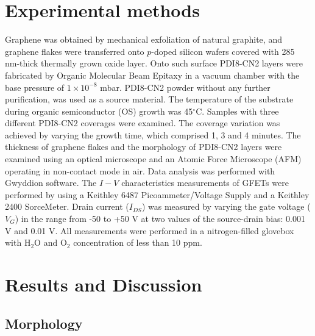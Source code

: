 \documentclass[review]{elsarticle}
\begin{document}
\section{\label{sec:exper}Experimental methods}


Graphene was obtained by mechanical exfoliation of natural graphite, and  graphene flakes were transferred onto $p$-doped silicon wafers covered with 285 nm-thick thermally grown oxide layer.
 Onto such surface PDI8-CN2 layers were fabricated by Organic Molecular Beam Epitaxy in a vacuum chamber with the base pressure of $1\times10^{-8}$ mbar.
 PDI8-CN2 powder without any further purification, was used as a source material.
 The temperature of the substrate during organic semiconductor (OS) growth was 45$^\circ$C.
 Samples with three different PDI8-CN2 coverages were examined.
 The coverage variation was achieved by varying the growth time, which comprised 1, 3 and 4 minutes.
 The thickness of graphene flakes and the morphology of PDI8-CN2 layers were examined using an optical microscope and an Atomic Force Microscope (AFM) operating in non-contact mode in air.
 Data analysis was performed with Gwyddion software\cite{necas-2012}.
 The $I-V$ characteristics measurements of GFETs were performed by using a Keithley 6487 Picoammeter/Voltage Supply and a Keithley 2400 SorceMeter.
 Drain current ($I_{DS}$) was measured by varying the gate voltage ($V_G$) in the range from -50 to +50 V at two values of the source-drain bias: 0.001 V and 0.01 V.
 All measurements were performed in a nitrogen-filled glovebox with H$_2$O and O$_2$ concentration of less than 10 ppm.



\section{\label{sec:res}Results and Discussion}

\subsection{\label{sec:morph}Morphology}
\end{document}
